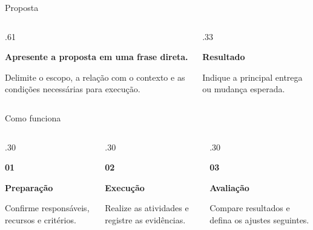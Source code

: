 \documentclass[aspectratio=169,11pt]{beamer}
\begin{document}
\begin{frame}{Proposta}
  \begin{columns}[c,onlytextwidth]
    \begin{column}{.61\textwidth}
      {\IEEECSHeadingFont\bfseries\Large
        Apresente a proposta em uma frase direta.\par}
      \medskip
      Delimite o escopo, a relação com o contexto e as condições necessárias
      para execução.
    \end{column}
    \begin{column}{.33\textwidth}
      {\IEEECSHeadingFont\bfseries\color{IEEEBlue}Resultado\par}
      \medskip
      Indique a principal entrega ou mudança esperada.
    \end{column}
  \end{columns}
\end{frame}

\begin{frame}{Como funciona}
  \begin{columns}[T,onlytextwidth]
    \begin{column}{.30\textwidth}
      {\IEEECSHeadingFont\bfseries\color{IEEEBlue}01\par}
      \medskip
      \textbf{Preparação}\par
      Confirme responsáveis, recursos e critérios.
    \end{column}
    \begin{column}{.30\textwidth}
      {\IEEECSHeadingFont\bfseries\color{IEEEBlue}02\par}
      \medskip
      \textbf{Execução}\par
      Realize as atividades e registre as evidências.
    \end{column}
    \begin{column}{.30\textwidth}
      {\IEEECSHeadingFont\bfseries\color{IEEEBlue}03\par}
      \medskip
      \textbf{Avaliação}\par
      Compare resultados e defina os ajustes seguintes.
    \end{column}
  \end{columns}
\end{frame}
\end{document}
